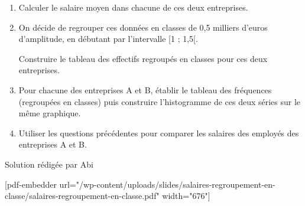 \begin{enumerate}
     \item
     Calculer le salaire moyen dans chacune de ces deux entreprises.
     \item
     On décide de regrouper ces données en classes de 0,5 milliers d'euros d'amplitude, en débutant par l'intervalle [1 ; 1,5[.
     \par
     Construire le tableau des effectifs regroupés en classes pour ces deux entreprises.
     \item
     Pour chacune des entreprises A et B, établir le tableau des fréquences (regroupées en classes) puis construire l'histogramme de ces deux séries sur le même graphique.
     \item
     Utiliser les questions précédentes pour comparer les salaires des employés des entreprises A et B.
\end{enumerate}
\begin{corrige}
     Solution rédigée par Abi
     \par
{}%
     [pdf-embedder url="/wp-content/uploads/slides/salaires-regroupement-en-classe/salaires-regroupement-en-classe.pdf" width="676"]
\end{corrige}
